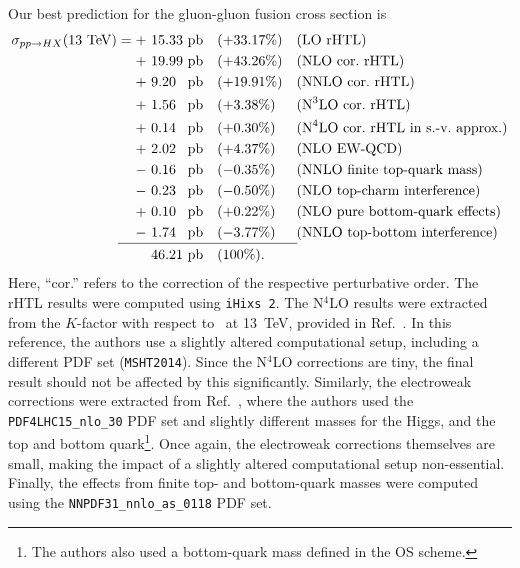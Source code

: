 Our best prediction for the gluon-gluon fusion cross section is
\begin{equation}
\begin{alignedat}{4}
\sigma_{pp \rightarrow HX} (13\ \mathrm{TeV}) = +\ & 15.33 \ &&\mathrm{pb    } && (+33.17\%) \quad  &&(\text{LO rHTL}) \\
+\ & 19.99\ &&\mathrm{pb} \quad && (+43.26\%)  &&(\text{NLO cor.\ rHTL}) \\
+\ & 9.20\ &&\mathrm{pb} \quad && (+19.91\%) &&(\text{NNLO cor.\ rHTL}) \\
+\ & 1.56\ &&\mathrm{pb} \quad && (+3.38\%) &&(\text{N}^3\text{LO cor.\ rHTL}) \\
+\ & 0.14\ &&\mathrm{pb} \quad && (+0.30\%) &&(\text{N}^4 \text{LO cor.\ rHTL in s.-v.\ approx.}) \\
+\ & 2.02\ &&\mathrm{pb} \quad && (+4.37\%) &&(\text{NLO EW-QCD}) \\
-\ & 0.16\ &&\mathrm{pb} \quad && (-0.35\%) &&(\text{NNLO finite top-quark mass}) \\
-\ & 0.23\ &&\mathrm{pb} \quad && (-0.50\%) &&(\text{NLO top-charm interference}) \\
+\ & 0.10 \ &&\mathrm{pb}\quad && (+0.22\%) &&(\text{NLO pure bottom-quark effects}) \\
-\ & 1.74\ &&\mathrm{pb} \quad && (-3.77\%) &&(\text{NNLO top-bottom interference}) \\[-10pt]
& &&  \hspace{0.5cm} \mathclap{\rule{4.5cm}{0.4pt}}\\[-4pt]
& 46.21 \ &&\mathrm{pb} && (100\%).
\end{alignedat}
\end{equation}
Here, ``cor.'' refers to the correction of the respective perturbative order. The \acs{rHTL} results were computed using \texttt{iHixs 2}. The N${}^4$LO results were extracted from the $K$-factor with respect to \NNNLO\ at 13~TeV, provided in Ref.~\cite{Das:2020adl}. In this reference, the authors use a slightly altered computational setup, including a different \acs{PDF} set (\texttt{MSHT2014}). Since the N${}^4$LO corrections are tiny, the final result should not be affected by this significantly. Similarly, the electroweak corrections were extracted from Ref.~\cite{Becchetti:2020wof}, where the authors used the \texttt{PDF4LHC15\_nlo\_30} PDF set and slightly different masses for the Higgs, and the top and bottom quark\footnote{The authors also used a bottom-quark mass defined in the \acs{OS} scheme.}. Once again, the electroweak corrections themselves are small, making the impact of a slightly altered computational setup non-essential. Finally, the effects from finite top- and bottom-quark masses were computed using the \texttt{NNPDF31\_nnlo\_as\_0118} PDF set.

